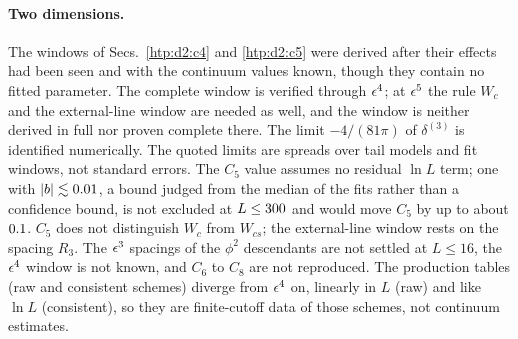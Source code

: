 \paragraph{Two dimensions.}\label{htp:d2:caveats}
The windows of Secs.~\ref{htp:d2:c4} and \ref{htp:d2:c5} were derived after their effects had been seen and with the continuum values
known, though they contain no fitted parameter. The complete window is verified through $\epsilon^4$; at $\epsilon^5$ the rule $W_c$
and the external-line window are needed as well, and the window is neither derived in full nor proven complete there. The limit
$-4/(81\pi)$ of $\delta^{(3)}$ is identified numerically. The quoted limits are spreads over tail models and fit windows, not
standard errors. The $C_5$ value assumes no residual $\ln L$ term; one with $|b|\lesssim0.01$, a bound judged from the
median of the fits rather than a confidence bound, is not excluded at $L\le300$ and would move $C_5$ by up to about
$0.1$. $C_5$ does not distinguish $W_c$ from $W_{cs}$; the external-line window rests on the spacing $R_3$. The $\epsilon^3$ spacings of the $\phi^2$ descendants are not settled at $L\le16$, the $\epsilon^4$
window is not known, and $C_6$ to $C_8$ are not reproduced. The production tables (raw and consistent schemes) diverge from
$\epsilon^4$ on, linearly in $L$ (raw) and like $\ln L$ (consistent), so they are finite-cutoff data of those schemes, not continuum
estimates.
